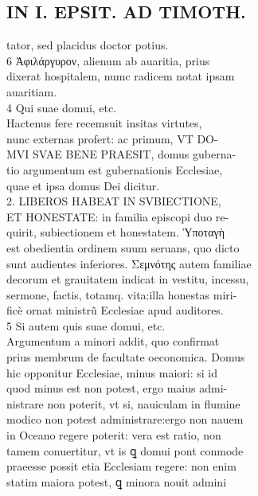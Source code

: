 \documentclass{article}
\begin{document}
\begin{pages}
\section*{IN I. EPSIT. AD TIMOTH. \\
                }
tator, sed placidus doctor potius. \\
                6 Ἀφιλάργυρον, alienum ab auaritia, prius \\
                dixerat hospitalem, numc radicem notat ipsam \\
                auaritiam. \\
                4 Qui suae domui, etc. \\
                Hactenus fere recemsuit insitas virtutes, \\
                nunc externas profert: ac primum, VT DO- \\
                MVI SVAE BENE PRAESIT, domus guberna- \\
                tio argumentum est gubernationis Ecclesiae, \\
                quae et ipsa domus Dei dicitur. \\
                2. LIBEROS HABEAT IN SVBIECTIONE, \\
                ET HONESTATE: in familia episcopi duo re- \\
                quirit, subiectionem et honestatem. Ὑποταγὴ \\
                est obedientia ordinem suum seruans, quo dicto \\
                sunt audientes inferiores. Σεμνότης autem familiae \\
                decorum et grauitatem indicat in vestitu, incessu, \\
                sermone, factis, totamq. vita:illa honestas miri- \\
                ficè ornat ministrũ Ecclesiae apud auditores. \\
                5 Si autem quis suae domui, etc. \\
                Argumentum a minori addit, quo confirmat \\
                prius membrum de facultate oeconomica. Domus \\
                hic opponitur Ecclesiae, minus maiori: si id \\
                quod minus est non potest, ergo maius admi- \\
                nistrare non poterit, vt si, nauiculam in flumine \\
                modico non potest administrare:ergo non nauem \\
                in Oceano regere poterit: vera est ratio, non \\
                tamem conuertitur, vt is ꝗ domui pont conmode \\
                praeesse possit etia Ecclesiam regere: non enim \\
                statim maiora potest, ꝗ minora nouit admini \\
                

\end{pages}
\end{document}
